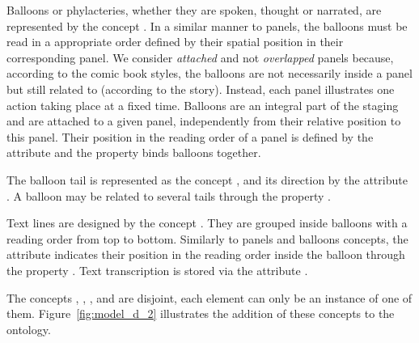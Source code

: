 Balloons or phylacteries, whether they are spoken, thought or narrated, are represented by the concept .
In a similar manner to panels, the balloons must be read in a appropriate order defined by their spatial position in their corresponding panel.
We consider \emph{attached} and not \emph {overlapped} panels because, according to the comic book styles, the balloons are not necessarily inside a panel but still related to (according to the story).
Instead, each panel illustrates one action taking place at a fixed time.
Balloons are an integral part of the staging and are attached to a given panel, independently from their relative position to this panel.
Their position in the reading order of a panel is defined by the attribute  and the property  binds balloons together.

The balloon tail is represented as the concept , and its direction by the attribute .
A balloon may be related to several tails through the property .

Text lines are designed by the concept .
They are grouped inside balloons with a reading order from top to bottom.
Similarly to panels and balloons concepts, the attribute  indicates their position in the reading order inside the balloon through the property .
Text transcription is stored via the attribute .


The concepts , , ,  and  are disjoint, each element can only be an instance of one of them.  
Figure~\ref{fig:model_d_2} illustrates the addition of these concepts to the ontology.

